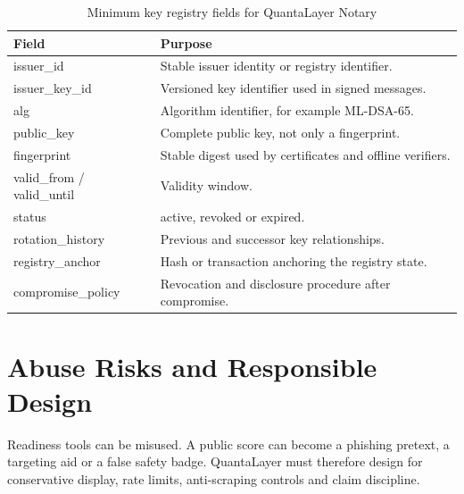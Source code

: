 \documentclass[11pt,a4paper,oneside,parskip=false]{scrartcl}
\begin{document}
\begin{table}[htbp]
\centering
\caption{Minimum key registry fields for QuantaLayer Notary}
\label{tab:key-registry}
\small
\begin{tabularx}{\textwidth}{L{0.28\textwidth}Y}
\toprule
\textbf{Field} & \textbf{Purpose} \\
\midrule
issuer\_id & Stable issuer identity or registry identifier. \\
issuer\_key\_id & Versioned key identifier used in signed messages. \\
alg & Algorithm identifier, for example ML-DSA-65. \\
public\_key & Complete public key, not only a fingerprint. \\
fingerprint & Stable digest used by certificates and offline verifiers. \\
valid\_from / valid\_until & Validity window. \\
status & active, revoked or expired. \\
rotation\_history & Previous and successor key relationships. \\
registry\_anchor & Hash or transaction anchoring the registry state. \\
compromise\_policy & Revocation and disclosure procedure after compromise. \\
\bottomrule
\end{tabularx}
\end{table}

\section{Abuse Risks and Responsible Design}

Readiness tools can be misused. A public score can become a phishing pretext, a targeting aid or a false safety badge. QuantaLayer must therefore design for conservative display, rate limits, anti-scraping controls and claim discipline.
\end{document}
